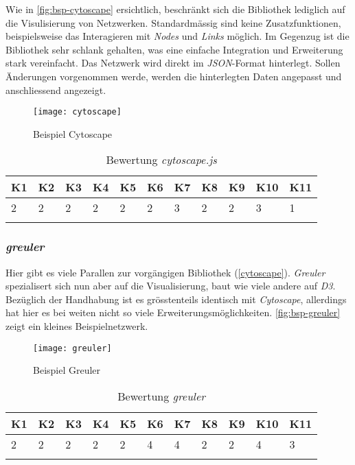 Wie in \autoref{fig:bsp-cytoscape} ersichtlich, beschränkt sich die Bibliothek lediglich auf die Visulisierung von Netzwerken. Standardmässig sind keine Zusatzfunktionen, beispielsweise das Interagieren mit \textit{Nodes} und \textit{Links} möglich. Im Gegenzug ist die Bibliothek sehr schlank gehalten, was eine einfache Integration und Erweiterung stark vereinfacht. Das Netzwerk wird direkt im \textit{JSON}-Format hinterlegt. Sollen Änderungen vorgenommen werde, werden die hinterlegten Daten angepasst und anschliessend angezeigt.

\begin{figure}[H]
\centering
\texttt{[image: cytoscape]}
\caption{Beispiel Cytoscape}
\label{fig:bsp-cytoscape}
\end{figure}


\begin{longtable}{|p{0.5cm}|p{0.5cm}|p{0.5cm}|p{0.5cm}|p{0.5cm}|p{0.5cm}|p{0.5cm}|p{0.5cm}|p{0.5cm}|p{0.7cm}|p{0.7cm}|}
  \hline
    K1 & K2 & K3 & K4 & K5 & K6 & K7 & K8 & K9 & K10 & K11 \\\hline
    2 & 2 & 2 & 2 & 2 & 2 & 3 & 2 & 2 & 3 & 1\\\hline
    \caption{Bewertung  \textit{cytoscape.js}}
  \label{tab:bewertung-cytoscape}
\end{longtable}

\subsubsection{\textit{greuler}}
Hier gibt es viele Parallen zur vorgängigen Bibliothek (\autoref{cytoscape}). \textit{Greuler} spezialisert sich nun aber auf die Visualisierung, baut wie viele andere auf \textit{D3}. Bezüglich der Handhabung ist es grösstenteils identisch mit \textit{Cytoscape}, allerdings hat hier es bei weiten nicht so viele Erweiterungsmöglichkeiten. \autoref{fig:bsp-greuler} zeigt ein kleines Beispielnetzwerk. \cite{2_maurizzzio/greuler_2016}

\begin{figure}[H]
\centering
\texttt{[image: greuler]}
\caption{Beispiel Greuler}
\label{fig:bsp-greuler}
\end{figure}

\begin{longtable}{|p{0.5cm}|p{0.5cm}|p{0.5cm}|p{0.5cm}|p{0.5cm}|p{0.5cm}|p{0.5cm}|p{0.5cm}|p{0.5cm}|p{0.7cm}|p{0.7cm}|}
  \hline
    K1 & K2 & K3 & K4 & K5 & K6 & K7 & K8 & K9 & K10 & K11 \\\hline
    2 & 2 & 2 & 2 & 2 & 4 & 4 & 2 & 2 & 4 & 3\\\hline
    \caption{Bewertung \textit{greuler}}
  \label{tab:bewertung-greuler}
\end{longtable}

